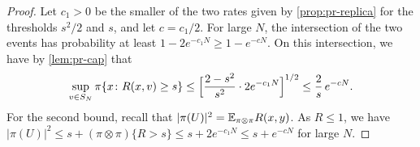 \begin{proof}
Let $c_1>0$ be the smaller of the two rates given by \cref{prop:pr-replica} for the thresholds $s^2/2$ and $s$, and let $c=c_1/2$. For large $N$, the intersection of the two events has probability at least $1-2e^{-c_1N}\ge1-e^{-cN}$. On this intersection, we have by \cref{lem:pr-cap} that
\[
\sup_{v\in S_N}\pi\{x\colon R(x,v)\ge s\}\le\Bigl[\frac{2-s^2}{s^2}\cdot2e^{-c_1N}\Bigr]^{1/2}\le\frac2s\,e^{-cN}.
\]
For the second bound, recall that $|\pi(U)|^2=\mathbb E_{\pi\otimes\pi}R(x,y)$. As $R\le1$, we have $|\pi(U)|^2\le s+(\pi\otimes\pi)\{R>s\}\le s+2e^{-c_1N}\le s+e^{-cN}$ for large $N$.
\end{proof}
